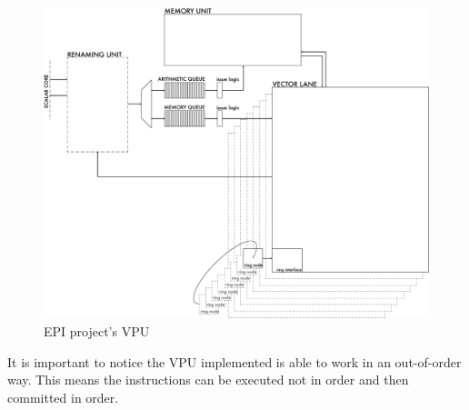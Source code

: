 \begin{figure}[H]
    \centering
    \includegraphics[scale = 0.4]{Chapter_1/img/VPU.png}
    \caption{EPI project's VPU}
    \label{VPU}
\end{figure}
It is important to notice the VPU implemented is able to work in an out-of-order way. This means the instructions can be executed not in order and then committed in order.\\


